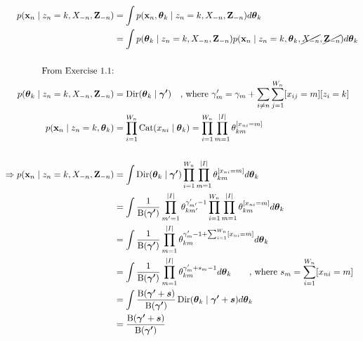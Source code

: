 \begin{enumerate}
    \begin{align*}
        p(\bold{x}_n \mid  z_n = k, X_{-n}, \mathbf{Z}_{-n}) &= \int p(\bold{x}_n, \boldsymbol{\theta}_k \mid  z_n = k, X_{-n}, \mathbf{Z}_{-n})d\boldsymbol{\theta}_k 
        \\
        &= \int p(\boldsymbol{\theta}_k \mid  z_n = k, X_{-n}, \mathbf{Z}_{-n})p(\bold{x}_n\mid  z_n = k, \boldsymbol{\theta}_k , \cancel{X_{-n}}, \cancel{\mathbf{Z}_{-n}})d\boldsymbol{\theta}_k
        \\\\
        \text{From Exercise 1.1:}
        \\
        p(\boldsymbol{\theta}_k \mid  z_n = k, X_{-n}, \mathbf{Z}_{-n}) &= \operatorname{Dir}(\boldsymbol{\theta}_k \mid\boldsymbol{\gamma'}) \quad \text{, where }\gamma'_m = \gamma_m + \sum_{i \neq n}\sum_{j=1}^{W_n}[x_{ij} = m][z_i = k] 
        \\
        p(\bold{x}_n\mid  z_n = k, \boldsymbol{\theta}_k) &= \prod_{i=1}^{W_n} \operatorname{Cat}(x_{ni} \mid \boldsymbol{\theta}_k) = \prod_{i=1}^{W_n} \prod_{m=1}^{\vert I \vert} \theta_{km}^{[x_{ni} = m]}
        \\\\
        \Rightarrow p(\bold{x}_n \mid  z_n = k, X_{-n}, \mathbf{Z}_{-n}) &= \int \operatorname{Dir}(\boldsymbol{\theta}_k \mid \boldsymbol{\gamma'}) \prod_{i=1}^{W_n} \prod_{m=1}^{\vert I \vert} \theta_{km}^{[x_{ni} = m]} d\boldsymbol{\theta}_k
        \\
        &= \int \frac{1}{\operatorname{B}(\boldsymbol{\gamma'})} \prod_{m'=1}^{\vert I \vert}\theta_{km'}^{\gamma'_{m'}-1}\prod_{i=1}^{W_n} \prod_{m=1}^{\vert I \vert} \theta_{km}^{[x_{ni} = m]} d\boldsymbol{\theta}_k 
        \\
        &= \int \frac{1}{\operatorname{B}(\boldsymbol{\gamma'})} \prod_{m=1}^{\vert I \vert}\theta_{km}^{\gamma'_m-1 + \sum_{i=1}^{W_n}[x_{ni} = m]} d\boldsymbol{\theta}_k 
        \\
        &= \int \frac{1}{\operatorname{B}(\boldsymbol{\gamma'})} \prod_{m=1}^{\vert I \vert}\theta_{km}^{\gamma'_m + s_m -1 } d\boldsymbol{\theta}_k \qquad \text{, where }s_m = \sum_{i=1}^{W_n}[x_{ni} = m]
        \\
        &= \int \frac{\operatorname{B}(\boldsymbol{\gamma'}+ \boldsymbol{s})}{\operatorname{B}(\boldsymbol{\gamma'})} \operatorname{Dir}(\boldsymbol{\theta}_k \mid \boldsymbol{\gamma'} + \boldsymbol{s})d\boldsymbol{\theta}_k
        \\
        &= \frac{\operatorname{B}(\boldsymbol{\gamma'}+ \boldsymbol{s})}{\operatorname{B}(\boldsymbol{\gamma'})}
    \end{align*}
    

\end{enumerate}
